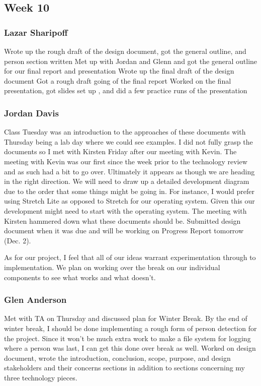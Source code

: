 \documentclass[onecolumn, draftclsnofoot,10pt, compsoc]{IEEEtran}
\begin{document}
\subsection{Week 10}
\subsubsection{Lazar Sharipoff}
Wrote up the rough draft of the design document, got the general outline, and person section written
\newline Met up with Jordan and Glenn and got the general outline for our final report and presentation
\newline Wrote up the final draft of the design document
\newline Got a rough draft going of the final report
\newline Worked on the final presentation, got slides set up , and did a few practice runs of the presentation


\subsubsection{Jordan Davis}
Class Tuesday was an introduction to the approaches of these documents with Thursday being a lab day where we could see examples. I did not fully grasp the documents so I met with Kirsten Friday after our meeting with Kevin. The meeting with Kevin was our first since the week prior to the technology review and as such had a bit to go over. Ultimately it appears as though we are heading in the right direction. We will need to draw up a detailed development diagram due to the order that some things might be going in. For instance, I would prefer using Stretch Lite as opposed to Stretch for our operating system. Given this our development might need to start with the operating system. The meeting with Kirsten hammered down what these documents should be. Submitted design document when it was due and will be working on Progress Report tomorrow (Dec. 2).
 
As for our project, I feel that all of our ideas warrant experimentation through to implementation. We plan on working over the break on our individual components to see what works and what doesn't.


\subsubsection{Glen Anderson}

Met with TA on Thursday and discussed plan for Winter Break. By the end of winter break, I should be done implementing a rough form of person detection for the project. Since it won't be much extra work to make a file system for logging where a person was last, I can get this done over break as well. Worked on design document, wrote the introduction, conclusion, scope, purpose, and design stakeholders and their concerns sections in addition to sections concerning my three technology pieces. 
\end{document}
